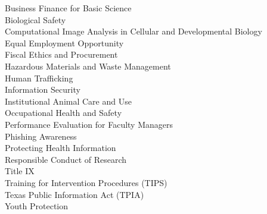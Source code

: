 \begin{center}
Business Finance for Basic Science \\
Biological Safety\\
Computational Image Analysis in Cellular and Developmental Biology \\
Equal Employment Opportunity  \\
Fiscal Ethics and Procurement \\
Hazardous Materials and Waste Management \\
Human Trafficking \\
Information Security \\
Institutional Animal Care and Use \\
Occupational Health and Safety\\ 
Performance Evaluation for Faculty Managers \\
Phishing Awareness \\
Protecting Health Information \\
Responsible Conduct of Research \\
Title IX \\
Training for Intervention Procedures (TIPS)  \\
Texas Public Information Act (TPIA) \\
Youth Protection \\
\end{center}
